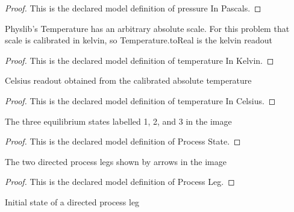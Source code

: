 \begin{proof}
  This is the declared model definition of pressure In Pascals.
\end{proof}
\begin{definition}
  \label{def:physics:phyx-mini-0367:phyxminiproblems-problemphyxmini0367-temperatureinkelvin}
  Physlib's Temperature has an arbitrary absolute scale. For this problem that scale is calibrated in kelvin, so Temperature.toReal is the kelvin readout
\end{definition}
\begin{proof}
  This is the declared model definition of temperature In Kelvin.
\end{proof}
\begin{definition}
  \label{def:physics:phyx-mini-0367:phyxminiproblems-problemphyxmini0367-temperatureincelsius}
  Celsius readout obtained from the calibrated absolute temperature
\end{definition}
\begin{proof}
  This is the declared model definition of temperature In Celsius.
\end{proof}
\begin{definition}
  \label{def:physics:phyx-mini-0367:phyxminiproblems-problemphyxmini0367-processstate}
  The three equilibrium states labelled 1, 2, and 3 in the image
\end{definition}
\begin{proof}
  This is the declared model definition of Process State.
\end{proof}
\begin{definition}
  \label{def:physics:phyx-mini-0367:phyxminiproblems-problemphyxmini0367-processleg}
  The two directed process legs shown by arrows in the image
\end{definition}
\begin{proof}
  This is the declared model definition of Process Leg.
\end{proof}
\begin{definition}
  \label{def:physics:phyx-mini-0367:phyxminiproblems-problemphyxmini0367-processleg-initialstate}
  Initial state of a directed process leg
\end{definition}
